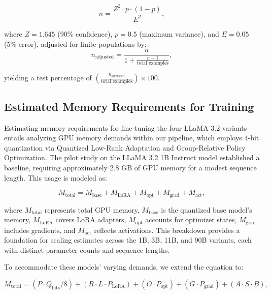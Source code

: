 \documentclass{svproc}
\begin{document}
\begin{equation}
  n = \frac{Z^2 \cdot p \cdot (1 - p)}{E^2},
\end{equation}

\noindent
where \(Z = 1.645\) (90\% confidence), \(p = 0.5\) (maximum variance), and \(E = 0.05\) (5\% error), adjusted for finite populations by:
\begin{equation}
  n_{\text{adjusted}} = \frac{n}{1 + \frac{n - 1}{\text{total examples}}},
\end{equation}

\noindent
yielding a test percentage of \(\left(\frac{n_{\text{adjusted}}}{\text{total examples}}\right) \times 100\).

\begin{center}
  
  
  
\end{center}


\subsection{Estimated Memory Requirements for Training}

Estimating memory requirements for fine-tuning the four LLaMA 3.2 variants entails analyzing GPU memory demands within our pipeline, which employs 4-bit quantization via Quantized Low-Rank Adaptation and Group-Relative Policy Optimization. The pilot study on the LLaMA 3.2 1B Instruct model established a baseline, requiring approximately 2.8 GB of GPU memory for a modest sequence length. This usage is modeled as:

\begin{equation}
  M_{\text{total}} = M_{\text{base}} + M_{\text{LoRA}} + M_{\text{opt}} + M_{\text{grad}} + M_{\text{act}},
\end{equation}

\noindent
where \(M_{\text{total}}\) represents total GPU memory, \(M_{\text{base}}\) is the quantized base model’s memory, \(M_{\text{LoRA}}\) covers LoRA adapters, \(M_{\text{opt}}\) accounts for optimizer states, \(M_{\text{grad}}\) includes gradients, and \(M_{\text{act}}\) reflects activations. This breakdown provides a foundation for scaling estimates across the 1B, 3B, 11B, and 90B variants, each with distinct parameter counts and sequence lengths.

To accommodate these models’ varying demands, we extend the equation to:

\begin{equation}
  M_{\text{total}} = (P \cdot Q_{\text{bits}} / 8) + (R \cdot L \cdot P_{\text{LoRA}}) + (O \cdot P_{\text{opt}}) + (G \cdot P_{\text{grad}}) + (A \cdot S \cdot B),
\end{equation}
\end{document}
